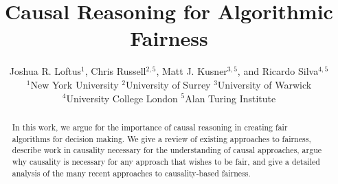 \documentclass{article}
\date{}
\begin{document}
\title{Causal Reasoning for Algorithmic Fairness}

\author{%
Joshua R. Loftus$^{1}$, Chris Russell$^{2,5}$, Matt J. Kusner$^{3,5}$, and Ricardo Silva$^{4,5}$\\
$^{1}$New York University
  $^{2}$University of Surrey
    $^{3}$University of Warwick\\ 
  $^{4}$University College London
  $^{5}$Alan Turing Institute 
}

  




\maketitle

\begin{abstract}
In this work, we argue for the importance of causal reasoning in creating fair
algorithms for decision making. We give a review of existing
approaches to fairness, describe work in causality necessary for the
understanding of causal approaches, argue why causality is necessary for any approach that wishes to be fair, and give a detailed analysis of the many recent approaches to causality-based fairness.   
\end{abstract}

\end{document}
